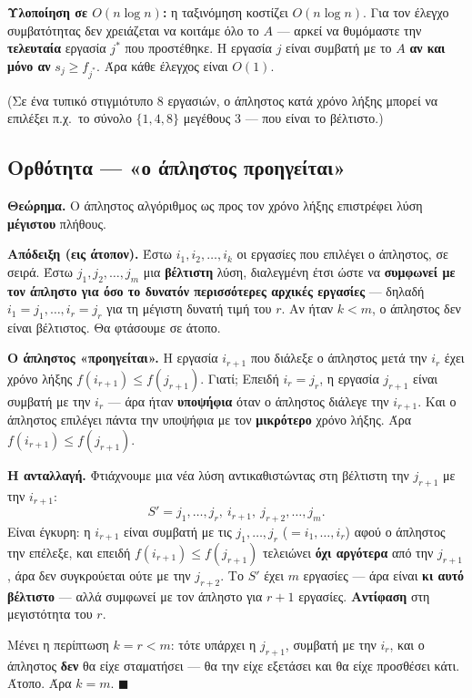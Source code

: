 \documentclass[11pt,a4paper]{article}
\begin{document}
\textbf{Υλοποίηση σε $O(n \log n)$:} η ταξινόμηση κοστίζει $O(n \log n)$. Για τον
έλεγχο συμβατότητας δεν χρειάζεται να κοιτάμε όλο το $A$ --- αρκεί να θυμόμαστε
την \textbf{τελευταία} εργασία $j^*$ που προστέθηκε. Η εργασία $j$ είναι συμβατή
με το $A$ \textbf{αν και μόνο αν} $s_j \ge f_{j^*}$. Άρα κάθε έλεγχος είναι
$O(1)$.

(Σε ένα τυπικό στιγμιότυπο 8 εργασιών, ο άπληστος κατά χρόνο λήξης μπορεί να
επιλέξει π.χ.\ το σύνολο $\{1, 4, 8\}$ μεγέθους 3 --- που είναι το βέλτιστο.)

\subsection{Ορθότητα --- «ο άπληστος προηγείται»}

\begin{keypoint}
\textbf{Θεώρημα.} Ο άπληστος αλγόριθμος ως προς τον χρόνο λήξης επιστρέφει λύση
\textbf{μέγιστου} πλήθους.
\end{keypoint}

\textbf{Απόδειξη (εις άτοπον).} Έστω $i_1, i_2, \dots, i_k$ οι εργασίες που
επιλέγει ο άπληστος, σε σειρά. Έστω $j_1, j_2, \dots, j_m$ μια \textbf{βέλτιστη}
λύση, διαλεγμένη έτσι ώστε να \textbf{συμφωνεί με τον άπληστο για όσο το δυνατόν
περισσότερες αρχικές εργασίες} --- δηλαδή $i_1 = j_1, \dots, i_r = j_r$ για τη
μέγιστη δυνατή τιμή του $r$. Αν ήταν $k < m$, ο άπληστος δεν είναι βέλτιστος. Θα
φτάσουμε σε άτοπο.

\textbf{Ο άπληστος «προηγείται».} Η εργασία $i_{r+1}$ που διάλεξε ο άπληστος μετά
την $i_r$ έχει χρόνο λήξης $f(i_{r+1}) \le f(j_{r+1})$. Γιατί; Επειδή
$i_r = j_r$, η εργασία $j_{r+1}$ είναι συμβατή με την $i_r$ --- άρα ήταν
\textbf{υποψήφια} όταν ο άπληστος διάλεγε την $i_{r+1}$. Και ο άπληστος επιλέγει
πάντα την υποψήφια με τον \textbf{μικρότερο} χρόνο λήξης. Άρα
$f(i_{r+1}) \le f(j_{r+1})$.

\textbf{Η ανταλλαγή.} Φτιάχνουμε μια νέα λύση αντικαθιστώντας στη βέλτιστη την
$j_{r+1}$ με την $i_{r+1}$:
\[
S' = j_1, \dots, j_r,\ i_{r+1},\ j_{r+2}, \dots, j_m.
\]
Είναι έγκυρη: η $i_{r+1}$ είναι συμβατή με τις $j_1, \dots, j_r$
($= i_1, \dots, i_r$) αφού ο άπληστος την επέλεξε, και επειδή
$f(i_{r+1}) \le f(j_{r+1})$ τελειώνει \textbf{όχι αργότερα} από την $j_{r+1}$,
άρα δεν συγκρούεται ούτε με την $j_{r+2}$. Το $S'$ έχει $m$ εργασίες --- άρα
είναι \textbf{κι αυτό βέλτιστο} --- αλλά συμφωνεί με τον άπληστο για $r+1$
εργασίες. \textbf{Αντίφαση} στη μεγιστότητα του $r$.

Μένει η περίπτωση $k = r < m$: τότε υπάρχει η $j_{r+1}$, συμβατή με την $i_r$,
και ο άπληστος \textbf{δεν} θα είχε σταματήσει --- θα την είχε εξετάσει και θα
είχε προσθέσει κάτι. Άτοπο. Άρα $k = m$. $\blacksquare$
\end{document}
